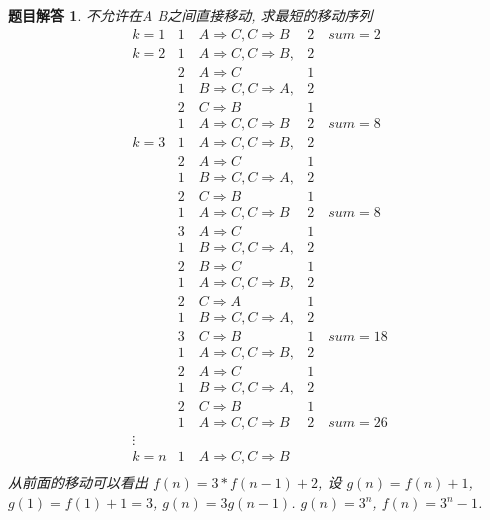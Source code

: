 \documentclass[mode=geye, chinesefont=founder]{elegantnote}
\newtheorem{answer}{题目解答}
\begin{document}
\begin{answer}
	不允许在A B之间直接移动, 求最短的移动序列
	\begin{equation*}
	\begin{array}{cll}
		k=1     & 1\quad A \Rightarrow C, C \Rightarrow B   & 2 \quad sum=2\\
		k=2     & 1\quad A \Rightarrow C, C \Rightarrow B,  & 2	\\
				& 2\quad A \Rightarrow C                 		& 1	\\
			 	& 1\quad B \Rightarrow C, C \Rightarrow A,  & 2	\\
			 	& 2\quad C \Rightarrow B						& 1	\\
			 	& 1\quad A \Rightarrow C, C \Rightarrow B   & 2 \quad sum=8 \\
		k=3     & 1\quad A \Rightarrow C, C \Rightarrow B,  & 2	\\
				& 2\quad A \Rightarrow C                 		& 1	\\
				& 1\quad B \Rightarrow C, C \Rightarrow A,  & 2	\\
				& 2\quad C \Rightarrow B						& 1	\\
				& 1\quad A \Rightarrow C, C \Rightarrow B   & 2 \quad sum=8\\
				& 3\quad A \Rightarrow C                 		& 1	\\
				& 1\quad B \Rightarrow C, C \Rightarrow A,  & 2	\\
				& 2\quad B \Rightarrow C						& 1	\\
				& 1\quad A \Rightarrow C, C \Rightarrow B,  & 2	\\
				& 2\quad C \Rightarrow A						& 1	\\
				& 1\quad B \Rightarrow C, C \Rightarrow A,  & 2	\\
				& 3\quad C \Rightarrow B						& 1	\quad sum=18\\
				& 1\quad A \Rightarrow C, C \Rightarrow B,  & 2	\\
				& 2\quad A \Rightarrow C                 		& 1	\\
				& 1\quad B \Rightarrow C, C \Rightarrow A,  & 2	\\
				& 2\quad C \Rightarrow B						& 1	\\
				& 1\quad A \Rightarrow C, C \Rightarrow B   & 2 \quad sum=26\\
		\vdots  &													& \\
		k=n     & 1\quad A \Rightarrow C, C \Rightarrow B	&  \\
	\end{array}
	\end{equation*}
	从前面的移动可以看出 $ f(n) = 3*f(n-1)+2 $, 设 $ g(n) = f(n)+1 $, $ g(1)=f(1)+1 = 3 $, $ g(n) = 3g(n-1) $. $ g(n) = 3^{n} $, $ f(n) = 3^{n}-1 $.
\end{answer}
\end{document}
